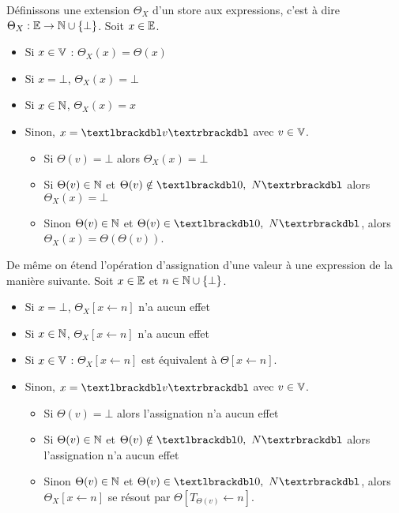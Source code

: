 \begin{defi}
 Définissons une extension $\Theta_X$ d'un store aux expressions, c'est à dire $\Theta_X:\mathbb E\rightarrow\mathbb N\cup\{\bot\}$. Soit $x\in\mathbb E$.
 \begin{itemize}
  \item Si $x\in\mathbb V$ : $\Theta_X(x)=\Theta(x)$
  \item Si $x=\bot$, $\Theta_X(x)=\bot$
  \item Si $x\in\mathbb N$, $\Theta_X(x)=x$
  \item Sinon, $x=\textlbrackdbl v\textrbrackdbl$ avec $v\in\mathbb V$.
  \begin{itemize}
   \item Si $\Theta(v)=\bot$ alors $\Theta_X(x)=\bot$
   \item Si $\Theta(v)\in\mathbb N$ et $\Theta(v)\notin\textlbrackdbl 0,\ N\textrbrackdbl$ alors $\Theta_X(x)=\bot$
   \item Sinon $\Theta(v)\in\mathbb N$ et $\Theta(v)\in\textlbrackdbl 0,\ N\textrbrackdbl$, alors $\Theta_X(x)=\Theta(\Theta(v))$.
  \end{itemize}
 \end{itemize}
  De même on étend l'opération d'assignation d'une valeur à une expression de la manière suivante. Soit $x\in\mathbb E$ et $n\in\mathbb N\cup\{\bot\}$.
  \begin{itemize}
  \item Si $x=\bot$, $\Theta_X[x\leftarrow n]$ n'a aucun effet
  \item Si $x\in\mathbb N$, $\Theta_X[x\leftarrow n]$ n'a aucun effet
  \item Si $x\in\mathbb V$ : $\Theta_X[x\leftarrow n]$ est équivalent à $\Theta[x\leftarrow n]$.
  \item Sinon, $x=\textlbrackdbl v\textrbrackdbl$ avec $v\in\mathbb V$.
    \begin{itemize}
   \item Si $\Theta(v)=\bot$ alors l'assignation n'a aucun effet
   \item Si $\Theta(v)\in\mathbb N$ et $\Theta(v)\notin\textlbrackdbl 0,\ N\textrbrackdbl$ alors l'assignation n'a aucun effet
   \item Sinon $\Theta(v)\in\mathbb N$ et $\Theta(v)\in\textlbrackdbl 0,\ N\textrbrackdbl$, alors $\Theta_X[x\leftarrow n]$ se résout par $\Theta[T_{\Theta(v)}\leftarrow n]$.
  \end{itemize}
  \end{itemize}
\label{def:sem_store_dynamique_pointeurs}
\end{defi}

